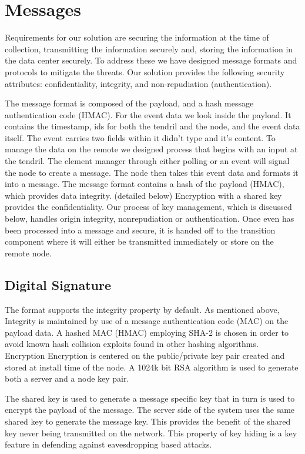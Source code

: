 \section{Messages}
Requirements for our solution are securing the information at the time of collection, transmitting the information securely and, storing the information in the data center securely. To address these we have designed message formats and protocols to mitigate the threats. Our solution provides the following security attributes:  confidentiality, integrity, and non-repudiation (authentication). 

The message format is composed of the payload, and a hash message authentication code (HMAC). For the event data we look inside the payload. It contains the timestamp, ids for both the tendril and the node, and the event data itself. The event carries two fields within it didn’t type and it’s content.  To manage the data on the remote we designed process that begins with an input at the tendril. The element manager through either polling or an event will signal the node to create a message. The node then takes this event data and formats it into a message. The message format contains a hash of the payload (HMAC), which provides data integrity. (detailed below) Encryption with a shared key provides the confidentiality. Our process of key management, which is discussed below, handles origin integrity, nonrepudiation or authentication.   Once even has been processed into a message and secure, it is handed off to the transition component where it will either be transmitted immediately or store on the remote node.

\subsection{Digital Signature}
The format supports the integrity property by default. As mentioned above, Integrity is maintained by use of a message authentication code (MAC) on the payload data. A hashed MAC (HMAC) employing SHA-2 is chosen in order to avoid known hash collision exploits found in other hashing algorithms. \cite{Turner:MiRyW-r_} 
Encryption 
Encryption is centered on the public/private key pair created and stored at install time of the node. A 1024k bit RSA algorithm is used to generate both a server and a node key pair. 

The shared key is used to generate a message specific key that in turn is used to encrypt the payload of the message. The server side of the system uses the same shared key to generate the message key. This provides the benefit of the shared key never being transmitted on the network. This property of key hiding is a key feature in defending against eavesdropping based attacks.

